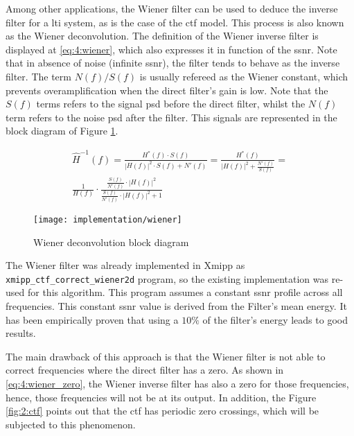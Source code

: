\documentclass[../main.tex]{subfiles}
\begin{document}
Among other applications, the Wiener filter can be used to deduce the inverse filter for a \gls{lti} system, as is the case of the \gls{ctf} model. This process is also known as the Wiener deconvolution. The definition of the Wiener inverse filter is displayed at \eqref{eq:4:wiener}, which also expresses it in function of the \gls{ssnr}. Note that in absence of noise (infinite \gls{ssnr}), the filter tends to behave as the inverse filter\cite{wetzstein2018}. The term $N(f)/S(f)$ is usually refereed as the Wiener constant, which prevents overamplification when the direct filter's gain is low. Note that the $S(f)$ terms refers to the signal \gls{psd} before the direct filter, whilst the $N(f)$ term refers to the noise \gls{psd} after the filter. This signals are represented in the block diagram of Figure \ref{fig:4:wiener_block}.

\begin{equation}\label{eq:4:wiener}
\begin{split}
    \hat{H}^{-1}(f) = 
    \frac{H^*(f) \cdot S(f)}{\left\vert H(f) \right\vert^2 \cdot S(f) + N'(f)} = 
    \frac{H^*(f)}{\left\vert H(f) \right\vert^2 + \frac{N'(f)}{S(f)}} = \\
    \frac{1}{H(f)} \cdot \frac{\frac{S(f)}{N'(f)} \cdot \left\vert H(f) \right\vert^2}{\frac{S(f)}{N'(f)} \cdot \left\vert H(f) \right\vert^2 + 1}
\end{split}
\end{equation}

\begin{figure}[htbp]
    \centering
    \texttt{[image: implementation/wiener]}
    \caption{Wiener deconvolution block diagram}
    \label{fig:4:wiener_block}
\end{figure}

The Wiener filter was already implemented in Xmipp\cite{sorzano2004} as \texttt{xmipp\_ctf\_correct\_wiener2d} program, so the existing implementation was re-used for this algorithm. This program assumes a constant \gls{ssnr} profile across all frequencies. This constant \gls{ssnr} value is derived from the Filter's mean energy. It has been empirically proven that using a $10\si{\percent}$ of the filter's energy leads to good results\cite{grigorieff2017}.

The main drawback of this approach is that the Wiener filter is not able to correct frequencies where the direct filter has a zero. As shown in \eqref{eq:4:wiener_zero}, the Wiener inverse filter has also a zero for those frequencies, hence, those frequencies will not be at its output. In addition, the Figure \ref{fig:2:ctf} points out that the \gls{ctf} has periodic zero crossings, which will be subjected to this phenomenon.
\end{document}

